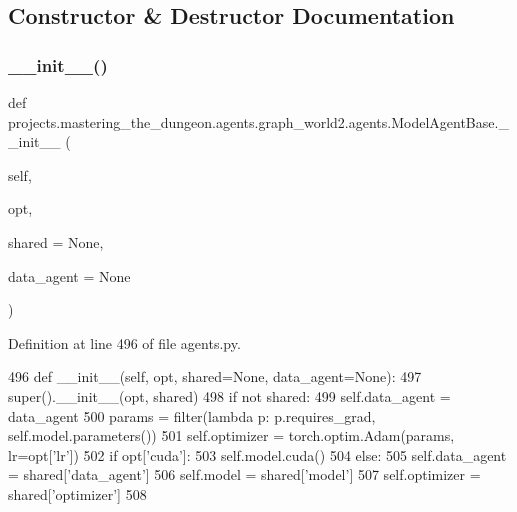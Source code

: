 \subsection{Constructor \& Destructor Documentation}
\mbox{\label{classprojects_1_1mastering__the__dungeon_1_1agents_1_1graph__world2_1_1agents_1_1ModelAgentBase_a2904306e4e9d603a78a72e65919fb63c}} 
\subsubsection{\texorpdfstring{\+\_\+\+\_\+init\+\_\+\+\_\+()}{\_\_init\_\_()}}
{\footnotesize\ttfamily def projects.\+mastering\+\_\+the\+\_\+dungeon.\+agents.\+graph\+\_\+world2.\+agents.\+Model\+Agent\+Base.\+\_\+\+\_\+init\+\_\+\+\_\+ (\begin{DoxyParamCaption}\item[{}]{self,  }\item[{}]{opt,  }\item[{}]{shared = {\ttfamily None},  }\item[{}]{data\+\_\+agent = {\ttfamily None} }\end{DoxyParamCaption})}



Definition at line 496 of file agents.\+py.


\begin{DoxyCode}
496     \textcolor{keyword}{def }\_\_init\_\_(self, opt, shared=None, data\_agent=None):
497         super().\_\_init\_\_(opt, shared)
498         \textcolor{keywordflow}{if} \textcolor{keywordflow}{not} shared:
499             self.data\_agent = data\_agent
500             params = filter(\textcolor{keyword}{lambda} p: p.requires\_grad, self.model.parameters())
501             self.optimizer = torch.optim.Adam(params, lr=opt[\textcolor{stringliteral}{'lr'}])
502             \textcolor{keywordflow}{if} opt[\textcolor{stringliteral}{'cuda'}]:
503                 self.model.cuda()
504         \textcolor{keywordflow}{else}:
505             self.data\_agent = shared[\textcolor{stringliteral}{'data\_agent'}]
506             self.model = shared[\textcolor{stringliteral}{'model'}]
507             self.optimizer = shared[\textcolor{stringliteral}{'optimizer'}]
508 
\end{DoxyCode}


